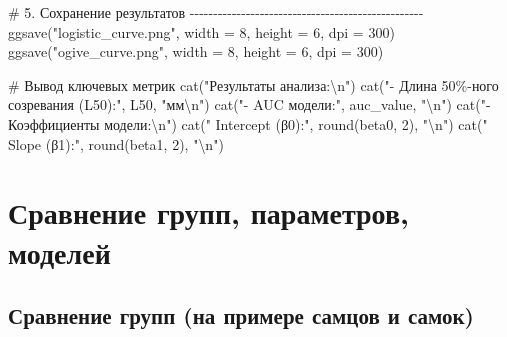 \documentclass[
  letterpaper,
  DIV=11,
  numbers=noendperiod]{scrreprt}
\newenvironment{Shaded}{\begin{snugshade}}{\end{snugshade}}
\newcommand{\AttributeTok}[1]{\textcolor[rgb]{0.40,0.45,0.13}{#1}}
\newcommand{\CommentTok}[1]{\textcolor[rgb]{0.37,0.37,0.37}{#1}}
\newcommand{\DecValTok}[1]{\textcolor[rgb]{0.68,0.00,0.00}{#1}}
\newcommand{\FunctionTok}[1]{\textcolor[rgb]{0.28,0.35,0.67}{#1}}
\newcommand{\NormalTok}[1]{\textcolor[rgb]{0.00,0.23,0.31}{#1}}
\newcommand{\SpecialCharTok}[1]{\textcolor[rgb]{0.37,0.37,0.37}{#1}}
\newcommand{\StringTok}[1]{\textcolor[rgb]{0.13,0.47,0.30}{#1}}
\begin{document}
\begin{Shaded}
\begin{Highlighting}[]
\CommentTok{\# 5. Сохранение результатов {-}{-}{-}{-}{-}{-}{-}{-}{-}{-}{-}{-}{-}{-}{-}{-}{-}{-}{-}{-}{-}{-}{-}{-}{-}{-}{-}{-}{-}{-}{-}{-}{-}{-}{-}{-}{-}{-}{-}{-}{-}{-}{-}{-}{-}{-}{-}{-}{-}{-}}
\FunctionTok{ggsave}\NormalTok{(}\StringTok{"logistic\_curve.png"}\NormalTok{, }\AttributeTok{width =} \DecValTok{8}\NormalTok{, }\AttributeTok{height =} \DecValTok{6}\NormalTok{, }\AttributeTok{dpi =} \DecValTok{300}\NormalTok{)}
\FunctionTok{ggsave}\NormalTok{(}\StringTok{"ogive\_curve.png"}\NormalTok{, }\AttributeTok{width =} \DecValTok{8}\NormalTok{, }\AttributeTok{height =} \DecValTok{6}\NormalTok{, }\AttributeTok{dpi =} \DecValTok{300}\NormalTok{)}

\CommentTok{\# Вывод ключевых метрик}
\FunctionTok{cat}\NormalTok{(}\StringTok{"Результаты анализа:}\SpecialCharTok{\textbackslash{}n}\StringTok{"}\NormalTok{)}
\FunctionTok{cat}\NormalTok{(}\StringTok{"{-} Длина 50\%{-}ного созревания (L50):"}\NormalTok{, L50, }\StringTok{"мм}\SpecialCharTok{\textbackslash{}n}\StringTok{"}\NormalTok{)}
\FunctionTok{cat}\NormalTok{(}\StringTok{"{-} AUC модели:"}\NormalTok{, auc\_value, }\StringTok{"}\SpecialCharTok{\textbackslash{}n}\StringTok{"}\NormalTok{)}
\FunctionTok{cat}\NormalTok{(}\StringTok{"{-} Коэффициенты модели:}\SpecialCharTok{\textbackslash{}n}\StringTok{"}\NormalTok{)}
\FunctionTok{cat}\NormalTok{(}\StringTok{"  Intercept (β0):"}\NormalTok{, }\FunctionTok{round}\NormalTok{(beta0, }\DecValTok{2}\NormalTok{), }\StringTok{"}\SpecialCharTok{\textbackslash{}n}\StringTok{"}\NormalTok{)}
\FunctionTok{cat}\NormalTok{(}\StringTok{"  Slope (β1):"}\NormalTok{, }\FunctionTok{round}\NormalTok{(beta1, }\DecValTok{2}\NormalTok{), }\StringTok{"}\SpecialCharTok{\textbackslash{}n}\StringTok{"}\NormalTok{)}
\end{Highlighting}
\end{Shaded}

\section{Сравнение групп, параметров,
моделей}\label{ux441ux440ux430ux432ux43dux435ux43dux438ux435-ux433ux440ux443ux43fux43f-ux43fux430ux440ux430ux43cux435ux442ux440ux43eux432-ux43cux43eux434ux435ux43bux435ux439}

\subsection{Сравнение групп (на примере самцов и
самок)}\label{ux441ux440ux430ux432ux43dux435ux43dux438ux435-ux433ux440ux443ux43fux43f-ux43dux430-ux43fux440ux438ux43cux435ux440ux435-ux441ux430ux43cux446ux43eux432-ux438-ux441ux430ux43cux43eux43a}
\end{document}
